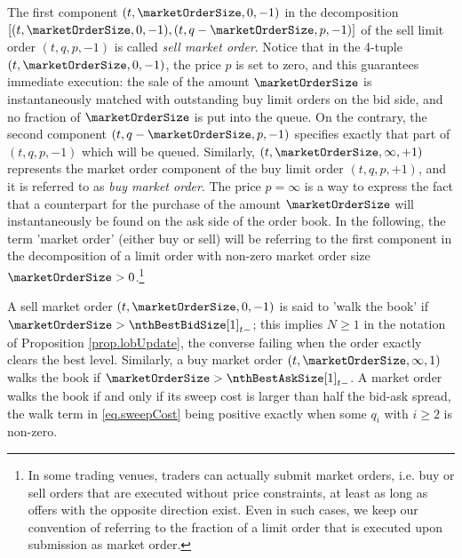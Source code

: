 The first component $(t,\marketOrderSize,0,-1)$
in the decomposition $[(t,\marketOrderSize,0,-1),(t,q-\marketOrderSize,p,-1) ]$
of the sell limit order $(t,q,p,-1)$ is called \emph{sell market order}.
Notice that in the 4-tuple $(t,\marketOrderSize,0,-1)$, the price $p$ is set to zero,
and this guarantees immediate execution:
the sale of the amount $\marketOrderSize$ is instantaneously matched
with outstanding buy limit orders on the bid side,
and no fraction of $\marketOrderSize$ is put into the queue.
On the contrary,
the second component $(t,q-\marketOrderSize,p,-1)$ specifies exactly that part of $(t,q,p,-1)$
which will be queued.
Similarly, $(t,\marketOrderSize,\infty,+1)$ represents the market order component of
the buy limit order $(t,q,p,+1)$,
and it is referred to as \emph{buy market order}.
The price $p=\infty$ is a way to express the fact that a counterpart
for the purchase of the amount $\marketOrderSize$
will instantaneously be found on the ask side of the order book.
In the following, the term 'market order' (either buy or sell) will be referring
to the first component in the decomposition of a limit order
with non-zero market order size $\marketOrderSize >0$.\footnote{
In some trading venues, traders can actually submit market orders,
i.e. buy or sell orders that are executed without price constraints,
at least as long as offers with the opposite direction exist.
Even in such cases, we keep our convention of referring to the fraction of a limit order
that is executed upon submission as market order.}

A sell market order $(t,\marketOrderSize,0,-1)$ is said to 'walk the book'
if $\marketOrderSize > \nthBestBidSize[1]_{t-}$;
this implies $N\geq 1 $ in the notation of Proposition \ref{prop.lobUpdate},
the converse failing when the order exactly clears the best level.
Similarly, a buy market order $(t,\marketOrderSize,\infty,1)$ walks the book
if $\marketOrderSize > \nthBestAskSize[1]_{t-}$.
A market order walks the book if and only if
its sweep cost is larger than half the bid-ask spread,
the walk term in \eqref{eq.sweepCost} being positive
exactly when some $q_i$ with $i\geq 2$ is non-zero.

